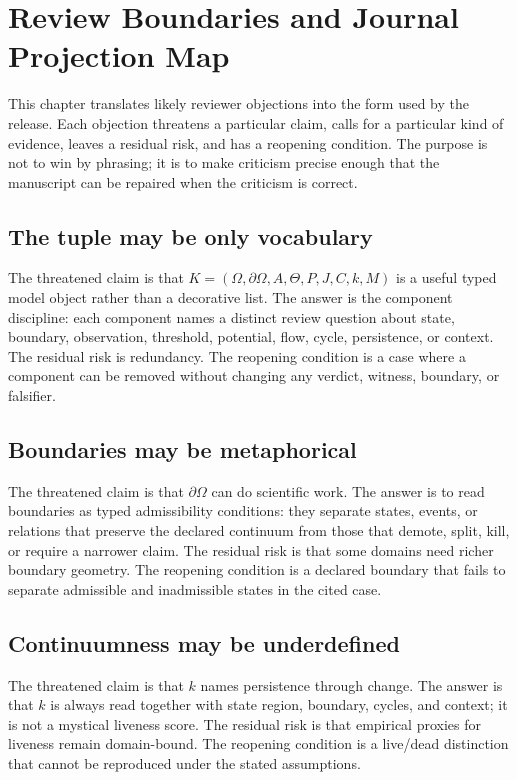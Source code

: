 \section{Review Boundaries and Journal Projection Map}
\label{sec:oc133-review-boundaries-journal-map}

This chapter translates likely reviewer objections into the form used by the
release. Each objection threatens a particular claim, calls for a particular
kind of evidence, leaves a residual risk, and has a reopening condition. The
purpose is not to win by phrasing; it is to make criticism precise enough that
the manuscript can be repaired when the criticism is correct.

\subsection{The tuple may be only vocabulary}

The threatened claim is that \(K=(\Omega,\partial\Omega,A,\Theta,P,J,C,k,M)\)
is a useful typed model object rather than a decorative list. The answer is the
component discipline: each component names a distinct review question about
state, boundary, observation, threshold, potential, flow, cycle, persistence,
or context. The residual risk is redundancy. The reopening condition is a case
where a component can be removed without changing any verdict, witness,
boundary, or falsifier.

\subsection{Boundaries may be metaphorical}

The threatened claim is that \(\partial\Omega\) can do scientific work. The
answer is to read boundaries as typed admissibility conditions: they separate
states, events, or relations that preserve the declared continuum from those
that demote, split, kill, or require a narrower claim. The residual risk is that
some domains need richer boundary geometry. The reopening condition is a
declared boundary that fails to separate admissible and inadmissible states in
the cited case.

\subsection{Continuumness may be underdefined}

The threatened claim is that \(k\) names persistence through change. The answer
is that \(k\) is always read together with state region, boundary, cycles, and
context; it is not a mystical liveness score. The residual risk is that
empirical proxies for liveness remain domain-bound. The reopening condition is
a live/dead distinction that cannot be reproduced under the stated assumptions.

